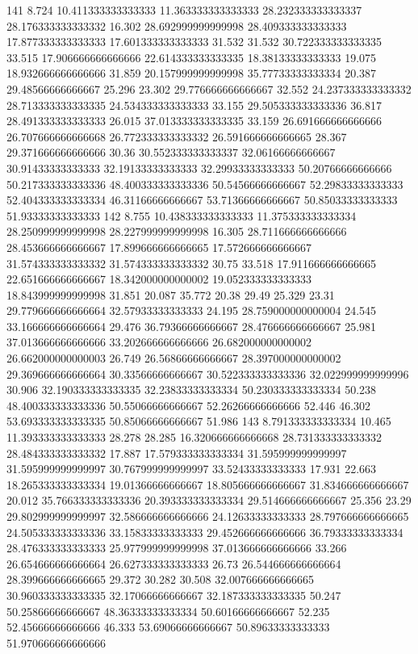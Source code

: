 141 8.724 10.411333333333333 11.363333333333333 28.232333333333337 28.176333333333332 16.302 28.692999999999998 28.409333333333333 17.877333333333333 17.601333333333333 31.532 31.532 30.722333333333335 33.515 17.906666666666666 22.614333333333335 18.38133333333333 19.075 18.932666666666666 31.859 20.157999999999998 35.77733333333334 20.387 29.48566666666667 25.296 23.302 29.776666666666667 32.552 24.237333333333332 28.713333333333335 24.534333333333333 33.155 29.505333333333336 36.817 28.491333333333333 26.015 37.013333333333335 33.159 26.691666666666666 26.707666666666668 26.772333333333332 26.591666666666665 28.367 29.371666666666666 30.36 30.552333333333337 32.06166666666667 30.91433333333333 32.19133333333333 32.29933333333333 50.20766666666666 50.217333333333336 48.400333333333336 50.54566666666667 52.29833333333333 52.404333333333334 46.31166666666667 53.71366666666667 50.85033333333333 51.93333333333333
142 8.755 10.438333333333333 11.375333333333334 28.250999999999998 28.227999999999998 16.305 28.711666666666666 28.453666666666667 17.899666666666665 17.572666666666667 31.574333333333332 31.574333333333332 30.75 33.518 17.911666666666665 22.651666666666667 18.342000000000002 19.052333333333333 18.843999999999998 31.851 20.087 35.772 20.38 29.49 25.329 23.31 29.779666666666664 32.57933333333333 24.195 28.759000000000004 24.545 33.166666666666664 29.476 36.79366666666667 28.476666666666667 25.981 37.013666666666666 33.202666666666666 26.682000000000002 26.662000000000003 26.749 26.56866666666667 28.397000000000002 29.369666666666664 30.33566666666667 30.522333333333336 32.022999999999996 30.906 32.190333333333335 32.23833333333334 50.230333333333334 50.238 48.400333333333336 50.55066666666667 52.26266666666666 52.446 46.302 53.693333333333335 50.85066666666667 51.986
143 8.791333333333334 10.465 11.393333333333333 28.278 28.285 16.320666666666668 28.731333333333332 28.484333333333332 17.887 17.579333333333334 31.595999999999997 31.595999999999997 30.767999999999997 33.52433333333333 17.931 22.663 18.265333333333334 19.01366666666667 18.805666666666667 31.834666666666667 20.012 35.766333333333336 20.393333333333334 29.514666666666667 25.356 23.29 29.802999999999997 32.586666666666666 24.12633333333333 28.797666666666665 24.505333333333336 33.15833333333333 29.452666666666666 36.79333333333334 28.476333333333333 25.977999999999998 37.013666666666666 33.266 26.654666666666664 26.627333333333333 26.73 26.544666666666664 28.399666666666665 29.372 30.282 30.508 32.007666666666665 30.960333333333335 32.17066666666667 32.187333333333335 50.247 50.25866666666667 48.36333333333334 50.60166666666667 52.235 52.45666666666666 46.333 53.69066666666667 50.89633333333333 51.970666666666666
